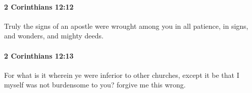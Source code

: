 		\paragraph{2 Corinthians 12:12} %
			\label{2CORINTHIANS-12-12}

			Truly the signs of an apostle were wrought among you in all patience, in signs, and wonders, and mighty deeds.

			\begin{framed}
			\scriptsize
				\begin{compactdesc}
					\item[SBLG] 
				\end{compactdesc}
			\end{framed}

		\paragraph{2 Corinthians 12:13} %
			\label{2CORINTHIANS-12-13}

			For what is it wherein ye were inferior to other churches, except it be that I myself was not burdensome to you?  forgive me this wrong.

